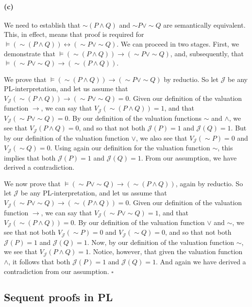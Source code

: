 \documentclass[sloppy, journal, git, bytitle]{humapap}
\begin{document}
\paragraph{(c)} We need to establish that $\sim(P\wedge Q)$ and $\sim P\vee\sim Q$ are semantically equivalent. 
This, in effect, means that proof is required for $\vDash (\sim(P\wedge Q))\leftrightarrow(\sim P\vee\sim Q)$. 
We can proceed in two stages. 
First, we demonstrate that $\vDash (\sim(P\wedge Q))\rightarrow(\sim P\vee\sim Q)$, 
and, subsequently, that $\vDash (\sim P\vee\sim Q)\rightarrow(\sim(P\wedge Q))$. 

We prove that $\vDash (\sim(P\wedge Q))\rightarrow(\sim P\vee\sim Q)$ by reductio. 
So let $\mathcal{J}$ be any PL-interpretation, and let us assume that 
$V\mathcal{_J}(\sim(P\wedge Q))\rightarrow(\sim P\vee\sim Q)=0$. 
Given our definition of the valuation function $\rightarrow$, we can say that 
$V\mathcal{_J}(\sim(P\wedge Q))=1$, and that 
$V\mathcal{_J}(\sim P\vee\sim Q)=0$. 
By our definition of the valuation functions $\sim$ and $\wedge$, we see that 
$V\mathcal{_J}(P\wedge Q)=0$, and so that not both $\mathcal{J}(P)=1$ and $\mathcal{J}(Q)=1$.
But by our definition of the valuation function $\vee$, we also see that 
$V\mathcal{_J}(\sim P)=0$ and 
$V\mathcal{_J}(\sim Q)=0$. 
Using again our definition for the valuation function $\sim$, this implies that both 
$\mathcal{J}(P)=1$ and 
$\mathcal{J}(Q)=1$.
From our assumption, we have derived a contradiction. 

We now prove that $\vDash (\sim P\vee\sim Q)\rightarrow(\sim(P\wedge Q))$, again by reductio. 
So let $\mathcal{J}$ be any PL-interpretation, and let us assume that 
$V\mathcal{_J}(\sim P\vee\sim Q)\rightarrow(\sim(P\wedge Q))=0$. 
Given our definition of the valuation function $\rightarrow$, we can say that 
$V\mathcal{_J}(\sim P\vee\sim Q)=1$, and that
$V\mathcal{_J}(\sim(P\wedge Q))=0$. 
By our definition of the valuation function $\vee$ and $\sim$, we see that not both 
$V\mathcal{_J}(\sim P)=0$ and 
$V\mathcal{_J}(\sim Q)=0$, and so that not both 
$\mathcal{J}(P)=1$ and 
$\mathcal{J}(Q)=1$. 
Now, by our definition of the valuation function $\sim$, we see that 
$V\mathcal{_J}(P\wedge Q)=1$.
Notice, however, that given the valuation function $\wedge$, 
it follows that both 
$\mathcal{J}(P)=1$ and 
$\mathcal{J}(Q)=1$.
And again we have derived a contradiction from our assumption. $\square$ 

\subsection{Sequent proofs in PL}
\end{document}
